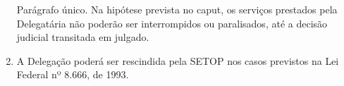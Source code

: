 \begin{enumerate}[resume, label=Art. \arabic*]
Parágrafo único. Na hipótese prevista no caput, os serviços prestados pela Delegatária não poderão ser interrompidos ou paralisados, até a decisão judicial transitada em julgado.

\item A Delegação poderá ser rescindida pela SETOP nos casos previstos na Lei Federal nº 8.666, de 1993.




\end{enumerate}






